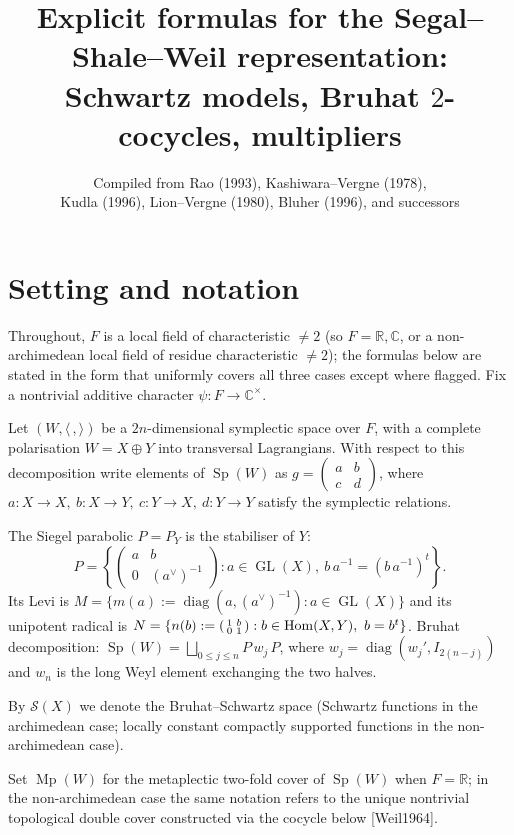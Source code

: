 \documentclass[11pt,letterpaper]{article}
\title{Explicit formulas for the Segal--Shale--Weil representation:\\
Schwartz models, Bruhat $2$-cocycles, multipliers}
\author{Compiled from Rao (1993), Kashiwara--Vergne (1978),\\
Kudla (1996), Lion--Vergne (1980), Bluher (1996), and successors}
\date{}
\newcommand{\Sp}{\operatorname{Sp}}
\newcommand{\Mp}{\operatorname{Mp}}
\newcommand{\GL}{\operatorname{GL}}
\newcommand{\Hom}{\operatorname{Hom}}
\newcommand{\diag}{\operatorname{diag}}
\newcommand{\Schwartz}{\mathcal{S}}
\newcommand{\F}{F}
\newcommand{\R}{\mathbb{R}}
\newcommand{\C}{\mathbb{C}}
\newcommand{\inv}{^{-1}}
\theoremstyle{plain}
\theoremstyle{definition}
\begin{document}
\maketitle

\section{Setting and notation}

Throughout, $\F$ is a local field of characteristic $\ne 2$ (so $\F = \R, \C$, or a non-archimedean local field of residue characteristic $\ne 2$); the formulas below are stated in the form that uniformly covers all three cases except where flagged.
Fix a nontrivial additive character $\psi : \F \to \C^\times$.

Let $(W,\langle\,,\rangle)$ be a $2n$-dimensional symplectic space over $\F$, with a complete polarisation $W = X \oplus Y$ into transversal Lagrangians.
With respect to this decomposition write elements of $\Sp(W)$ as $g = \begin{pmatrix} a & b \\ c & d \end{pmatrix}$, where $a:X\to X,\ b:X\to Y,\ c:Y\to X,\ d:Y\to Y$ satisfy the symplectic relations.

The Siegel parabolic $P = P_Y$ is the stabiliser of $Y$:
\[
P = \left\{ \begin{pmatrix} a & b \\ 0 & (a^\vee)\inv \end{pmatrix} : a \in \GL(X),\ b\,a^{-1} = (b\,a^{-1})^t \right\}.
\]
Its Levi is $M = \{ m(a) := \diag(a,(a^\vee)\inv) : a \in \GL(X)\}$ and its unipotent radical is
$N = \{ n(b) := \begin{psmallmatrix} 1 & b \\ 0 & 1 \end{psmallmatrix} : b \in \Hom(X,Y),\ b = b^t \}$.
Bruhat decomposition: $\Sp(W) = \bigsqcup_{0 \le j \le n} P\,w_j\,P$, where $w_j = \diag(w_j', I_{2(n-j)})$ and $w_n$ is the long Weyl element exchanging the two halves.

By $\Schwartz(X)$ we denote the Bruhat--Schwartz space (Schwartz functions in the archimedean case; locally constant compactly supported functions in the non-archimedean case).

Set $\Mp(W)$ for the metaplectic two-fold cover of $\Sp(W)$ when $\F = \R$; in the non-archimedean case the same notation refers to the unique nontrivial topological double cover constructed via the cocycle below [Weil1964].
\end{document}
